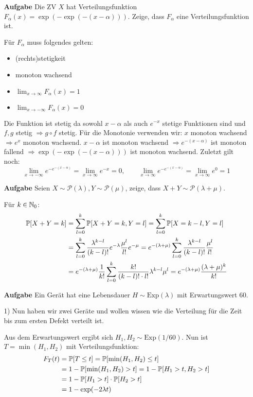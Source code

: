 \hrulefill

\textbf{Aufgabe}
Die ZV $X$ hat Verteilungsfunktion $F_\alpha(x) = \exp (-\exp (- (x - \alpha)))$. Zeige, dass $F_\alpha$ eine Verteilungsfunktion ist. \smallskip

Für $F_\alpha$ muss folgendes gelten:
\begin{itemize}
	\item (rechts)stetigkeit
	\item monoton wachsend
	\item $\lim_{x \to \infty} F_\alpha(x) = 1$
	\item $\lim_{x \to -\infty} F_\alpha(x) = 0$
\end{itemize}

Die Funktion ist stetig da sowohl $x - \alpha$ als auch $e^{-x}$ stetige Funktionen sind und $f,g$ stetig $\Rightarrow g \circ f$ stetig. Für die Monotonie verwenden wir: $x$ monoton wachsend $\Rightarrow e^x$ monoton wachsend. $x - \alpha$ ist monoton wachsend $\Rightarrow e^{-(x- \alpha)}$ ist monoton fallend $\Rightarrow \exp (-\exp (- (x - \alpha)))$ ist monoton wachsend. Zuletzt gilt noch:
$$\lim_{x \to -\infty} e^{- e^{-(x-\alpha)}} = \lim_{x \to \infty} e^{-x} = 0, \qquad \lim_{x \to \infty} e^{- e^{-(x-\alpha)}} = \lim_{x \to \infty} e^0 = 1$$

\hrulefill

\textbf{Aufgabe}
Seien $X \sim \mathcal P (\lambda), Y \sim \mathcal P (\mu)$, zeige, dass $X + Y \sim \mathcal P (\lambda + \mu)$.

Für $k \in \mathbb{N}_0$:
\begin{align*}
	\mathbb{P}[X + Y = k] &= \sum_{l = 0}^k \mathbb{P}[X + Y = k, Y = l] = \sum_{l = 0}^k \mathbb{P}[X = k - l, Y = l] \\
	&= \sum_{l = 0}^k \frac{\lambda^{k-l}}{(k-l)!}e^{-\lambda} \frac{\mu^l}{l!}e^{-\mu} = e^{-(\lambda + \mu)} \sum_{l = 0}^k \frac{\lambda^{k-l}}{(k-l)!}\frac{\mu^l}{l!} \\
	&= e^{-(\lambda + \mu)} \frac{1}{k!} \sum_{l = 0}^k \frac{k!}{(k-l)! \cdot l!} \lambda^{k-l} \mu^l = e^{-(\lambda + \mu)} \frac{(\lambda + \mu)^k}{k!}
\end{align*}

\hrulefill

\textbf{Aufgabe}
Ein Gerät hat eine Lebensdauer $H \sim \text{Exp}(\lambda)$ mit Erwartungswert 60. \smallskip

1) Nun haben wir zwei Geräte und wollen wissen wie die Verteilung für die Zeit bis zum ersten Defekt verteilt ist. 

Aus dem Erwartungswert ergibt sich $H_1, H_2 \sim \text{Exp}(1 / 60)$. Nun ist $T = \min (H_1, H_2)$ mit Verteilungsfunktion:
\begin{align*}
	F_T(t) &= \mathbb{P}[T \leq t] = \mathbb{P}[\min (H_1, H_2) \leq t] \\
	&= 1 - \mathbb{P}[\min (H_1, H_2) > t] = 1 - \mathbb{P}[H_1 > t, H_2 > t] \\
	&= 1 - \mathbb{P}[H_1 > t] \cdot \mathbb{P}[H_2 > t] \\
	&= 1 - \exp(-2 \lambda t)
\end{align*}

